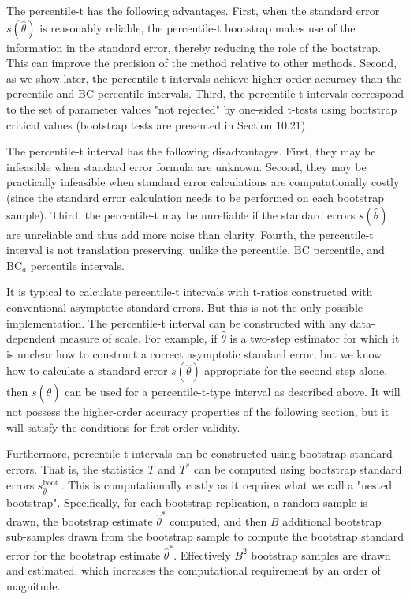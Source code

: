\documentclass[10pt]{article}
\begin{document}
The percentile-t has the following advantages. First, when the standard error $s(\widehat{\theta})$ is reasonably reliable, the percentile-t bootstrap makes use of the information in the standard error, thereby reducing the role of the bootstrap. This can improve the precision of the method relative to other methods. Second, as we show later, the percentile-t intervals achieve higher-order accuracy than the percentile and BC percentile intervals. Third, the percentile-t intervals correspond to the set of parameter values "not rejected" by one-sided t-tests using bootstrap critical values (bootstrap tests are presented in Section 10.21).

The percentile-t interval has the following disadvantages. First, they may be infeasible when standard error formula are unknown. Second, they may be practically infeasible when standard error calculations are computationally costly (since the standard error calculation needs to be performed on each bootstrap sample). Third, the percentile-t may be unreliable if the standard errors $s(\widehat{\theta})$ are unreliable and thus add more noise than clarity. Fourth, the percentile-t interval is not translation preserving, unlike the percentile, $\mathrm{BC}$ percentile, and $\mathrm{BC}_{a}$ percentile intervals.

It is typical to calculate percentile-t intervals with t-ratios constructed with conventional asymptotic standard errors. But this is not the only possible implementation. The percentile-t interval can be constructed with any data-dependent measure of scale. For example, if $\widehat{\theta}$ is a two-step estimator for which it is unclear how to construct a correct asymptotic standard error, but we know how to calculate a standard error $s(\widehat{\theta})$ appropriate for the second step alone, then $s(\widehat{\theta})$ can be used for a percentile-t-type interval as described above. It will not possess the higher-order accuracy properties of the following section, but it will satisfy the conditions for first-order validity.

Furthermore, percentile-t intervals can be constructed using bootstrap standard errors. That is, the statistics $T$ and $T^{*}$ can be computed using bootstrap standard errors $s_{\widehat{\theta}}^{\text {boot }}$. This is computationally costly as it requires what we call a "nested bootstrap". Specifically, for each bootstrap replication, a random sample is drawn, the bootstrap estimate $\widehat{\theta}^{*}$ computed, and then $B$ additional bootstrap sub-samples drawn from the bootstrap sample to compute the bootstrap standard error for the bootstrap estimate $\widehat{\theta}^{*}$. Effectively $B^{2}$ bootstrap samples are drawn and estimated, which increases the computational requirement by an order of magnitude.
\end{document}
